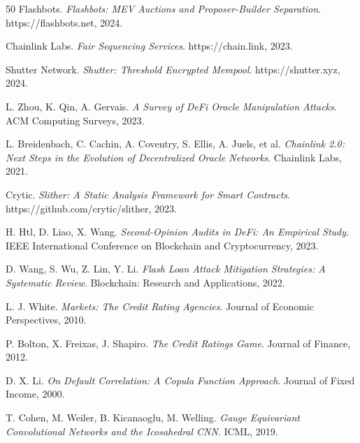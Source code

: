 \documentclass[12pt,a4paper]{article}
\theoremstyle{remark}
\begin{document}
\begin{thebibliography}{50}
Flashbots.
\textit{Flashbots: MEV Auctions and Proposer-Builder Separation}.
https://flashbots.net, 2024.

Chainlink Labs.
\textit{Fair Sequencing Services}.
https://chain.link, 2023.

Shutter Network.
\textit{Shutter: Threshold Encrypted Mempool}.
https://shutter.xyz, 2024.

L. Zhou, K. Qin, A. Gervais.
\textit{A Survey of DeFi Oracle Manipulation Attacks}.
ACM Computing Surveys, 2023.

L. Breidenbach, C. Cachin, A. Coventry, S. Ellis, A. Juels, et al.
\textit{Chainlink 2.0: Next Steps in the Evolution of Decentralized Oracle
Networks}.
Chainlink Labs, 2021.

Crytic.
\textit{Slither: A Static Analysis Framework for Smart Contracts}.
https://github.com/crytic/slither, 2023.

H. Htl, D. Liao, X. Wang.
\textit{Second-Opinion Audits in DeFi: An Empirical Study}.
IEEE International Conference on Blockchain and Cryptocurrency, 2023.

D. Wang, S. Wu, Z. Lin, Y. Li.
\textit{Flash Loan Attack Mitigation Strategies: A Systematic Review}.
Blockchain: Research and Applications, 2022.

L. J. White.
\textit{Markets: The Credit Rating Agencies}.
Journal of Economic Perspectives, 2010.

P. Bolton, X. Freixas, J. Shapiro.
\textit{The Credit Ratings Game}.
Journal of Finance, 2012.

D. X. Li.
\textit{On Default Correlation: A Copula Function Approach}.
Journal of Fixed Income, 2000.

T. Cohen, M. Weiler, B. Kicanaoglu, M. Welling.
\textit{Gauge Equivariant Convolutional Networks and the Icosahedral CNN}.
ICML, 2019.

\end{thebibliography}
\end{document}
